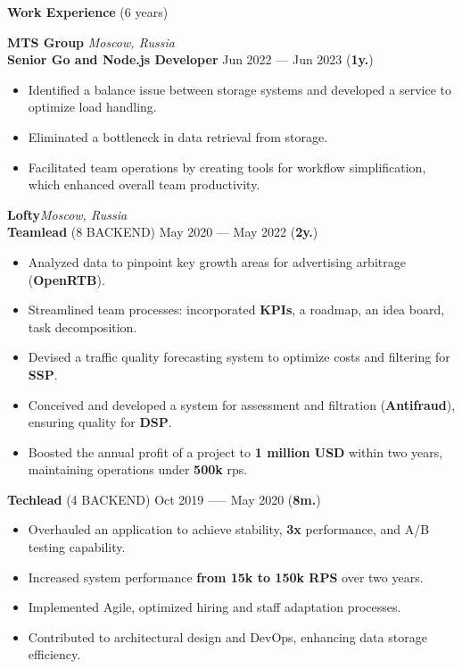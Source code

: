 \documentclass{resume}
\begin{document}
\begin{rSection}{\textbf{Work Experience} (6 years) }

\textbf{MTS Group} \hfill \textit{Moscow, Russia} \\
\textbf{Senior Go and Node.js Developer}  \hfill Jun 2022 --- Jun 2023 ({\textbf{1y.}})
\begin{itemize}
    \setlength\itemsep{-0.4em}
    \item Identified a balance issue between storage systems and developed a service to optimize load handling\@.
    \item Eliminated a bottleneck in data retrieval from storage\@.
    \item Facilitated team operations by creating tools for workflow simplification, which enhanced overall team productivity\@.
\end{itemize}

\textbf{Lofty}\hfill \textit{Moscow, Russia} \\
\textbf{Teamlead} (8 BACKEND) \hfill May 2020 --- May 2022 ({\textbf{2y.}})
\begin{itemize}
    \item Analyzed data to pinpoint key growth areas for advertising arbitrage (\textbf{OpenRTB})\@.
    \item Streamlined team processes: incorporated \textbf{KPIs}, a roadmap, an idea board, task decomposition\@.
    \item Devised a traffic quality forecasting system to optimize costs and filtering for \textbf{SSP}\@.
    \item Conceived and developed a system for assessment and filtration (\textbf{Antifraud}), ensuring quality for \textbf{DSP}\@.
    \item Boosted the annual profit of a project to \textbf{1 million USD} within two years, maintaining operations under \textbf{500k} rps\@.
\end{itemize}

\textbf{Techlead} (4 BACKEND) \hfill Oct 2019 —-- May 2020 ({\textbf{8m.}})
\begin{itemize}
    \item Overhauled an application to achieve stability, \textbf{3x} performance, and A/B testing capability\@.
    \item Increased system performance \textbf{from 15k to 150k RPS} over two years\@.
    \item Implemented Agile, optimized hiring and staff adaptation processes\@.
    \item Contributed to architectural design and DevOps, enhancing data storage efficiency\@.
\end{itemize}


\end{rSection}
\end{document}
